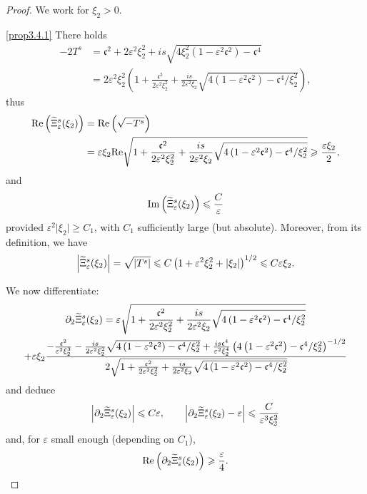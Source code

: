 \documentclass[10pt]{amsart}
\theoremstyle{definition}\newtheorem{defi}[theo]{Definition}\newtheorem{rema}[theo]{Remark}\newtheorem{exam}[theo]{Example}\newtheorem{exem}[theo]{Example}\newtheorem{nota}[theo]{Notation}
\newcommand*\p{\partial}
\newcommand{\Imm}{\mathrm{Im}}
\newcommand{\Rel}{\mathrm{Re}}
\newcommand*\cs{{\mathfrak c}}
\newcommand*\gs{\geqslant }
\newcommand*\ls{\leqslant }
\newcommand*\e{\varepsilon}
\renewcommand*\t{\tilde}
\let\oldtilde\tilde
\renewcommand*{\tilde}[1]{\mathchoice{\widetilde{#1}}{\widetilde{#1}}{\oldtilde{#1}}{\oldtilde{#1}}}
\begin{document}
\begin{proof}
We work for $ \xi_2 > 0 $.

\noindent\eqref{prop3.4.1}  There holds
\begin{align*}
- 2 T^s & = \cs^2 + 2 \e^2 \xi_2^2 + i s \sqrt{ 4 \xi_2^2 \left(1 - \e^2 \cs^2\right) - \cs^4 }
\\ & = 2 \e^2 \xi_2^2 \left(1 + \frac{\cs^2}{2 \e^2 \xi_2^2} + \frac{i s}{ 2\e^2 \xi_2} \sqrt{ 4 \left(1 - \e^2 \cs^2\right) - \cs^4 /\xi_2^2} \right),
\end{align*}
thus
\begin{align*}
\Rel \left(\t\Xi_\e^s (\xi_2) \right) & = \Rel \left(\sqrt{ - T^s } \right) \\
&= \e \xi_2 \Rel \sqrt{ 1 + \frac{\cs^2}{2 \e^2 \xi_2^2} + \frac{i s}{ 2\e^2 \xi_2} \sqrt{ 4\left(1 - \e^2 \cs^2\right) - \cs^4 /\xi_2^2}}
\gs \frac{\e \xi_2 }{2},
\end{align*}
and
\[
{\Imm} \left(\t\Xi_\e^s (\xi_2) \right) \ls \frac{C}{\e}
\]
provided $ \e^2 \lvert \xi_2 \rvert \gs C_1 $, with $ C_1 $ sufficiently large (but absolute). Moreover, from its definition, we have
\[
\left\lvert \t\Xi_\e^s (\xi_2) \right\rvert = \sqrt{\left\lvert T^s\right\rvert }
\ls C \left(1 + \e^2 \xi_2^2 + \lvert \xi_2 \rvert\right)^{1/2}
\ls C \e \xi_2.
\]

We now differentiate:
\begin{multline*}
\p_2 \t\Xi_\e^s (\xi_2) = \e \sqrt{ 1 + \frac{\cs^2}{2 \e^2 \xi_2^2} + \frac{i s}{ 2\e^2 \xi_2} \sqrt{ 4 \left(1 - \e^2 \cs^2\right) - \cs^4 /\xi_2^2 } }\\
+ \e \xi_2 \frac{ - \frac{\cs^2}{ \e^2 \xi_2^3} - \frac{i s}{ 2 \e^2 \xi_2^2} \sqrt{ 4\left(1 - \e^2 \cs^2\right) - \cs^4 /\xi_2^2 } + \frac{i s \cs^4}{\e^2 \xi_2^4 } \left(4 \left(1 - \e^2 \cs^2\right) - \cs^4 /\xi_2^2\right)^{-1/2}}{2 \sqrt{1 + \frac{\cs^2}{2 \e^2 \xi_2^2} + \frac{i s}{2\e^2 \xi_2} \sqrt{4\left(1 - \e^2 \cs^2\right) - \cs^4 /\xi_2^2}}}
\end{multline*}
and deduce
\[
\left\lvert \p_2 \t\Xi_\e^s (\xi_2) \right\rvert
\ls C \e,
\qquad
\left\lvert \p_2 \t\Xi_\e^s (\xi_2) - \e \right\rvert
\ls \frac{C}{\e^3 \xi_2^2}
\]
and, for $ \e $ small enough (depending on $C_1$),
\begin{align*}
\Rel \left(\p_2 \t\Xi_\e^s (\xi_2) \right)
\gs \frac{\e }{4}.
\end{align*}



\end{proof}
\end{document}
